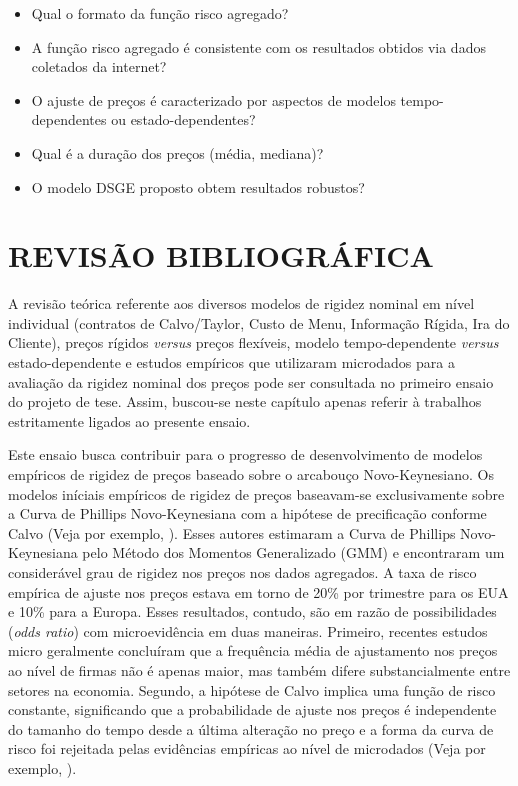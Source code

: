 \documentclass[twoside,a4paper,11pt]{report}
\begin{document}
\begin{itemize}
  \item Qual o formato da função risco agregado? 
  \item A função risco agregado é consistente com os resultados obtidos via dados coletados da internet?
  \item O ajuste de preços é caracterizado por aspectos de modelos tempo-dependentes ou estado-dependentes?
  \item Qual é a duração dos preços (média, mediana)?
  \item O modelo DSGE proposto obtem resultados robustos?
\end{itemize}


\pagestyle{empty}
\cleardoublepage
\pagestyle{fancy}

\chapter{REVISÃO BIBLIOGRÁFICA}\label{cap2en02}

A revisão teórica referente aos diversos modelos de rigidez nominal em nível individual (contratos de Calvo/Taylor, Custo de Menu, Informação Rígida, Ira do Cliente), preços rígidos \emph{versus} preços flexíveis, modelo tempo-dependente \emph{versus} estado-dependente e estudos empíricos que utilizaram microdados para a avaliação da rigidez nominal dos preços pode ser consultada no primeiro ensaio do projeto de tese. Assim, buscou-se neste capítulo apenas referir à trabalhos estritamente ligados ao presente ensaio. 

Este ensaio busca contribuir para o progresso de desenvolvimento de modelos empíricos de rigidez de preços baseado sobre o arcabouço Novo-Keynesiano. Os modelos iníciais empíricos de rigidez de preços baseavam-se exclusivamente sobre a Curva de Phillips Novo-Keynesiana com a hipótese de precificação conforme Calvo (Veja por exemplo, \citet{gali1999inflation,gali2001european,sbordone2002prices}). Esses autores estimaram a Curva de Phillips Novo-Keynesiana pelo Método dos Momentos Generalizado (GMM) e encontraram um considerável grau de rigidez nos preços nos dados agregados. A taxa de risco empírica de ajuste nos preços estava em torno de 20\% por trimestre para os EUA e 10\% para a Europa. Esses resultados, contudo, são em razão de possibilidades (\emph{odds ratio}) com microevidência em duas maneiras. Primeiro, recentes estudos micro geralmente concluíram que a frequência média de ajustamento nos preços ao nível de firmas não é apenas maior, mas também difere substancialmente entre setores na economia. Segundo, a hipótese de Calvo implica uma função de risco constante, significando que a probabilidade de ajuste nos preços é independente do tamanho do tempo desde a última alteração no preço e a forma da curva de risco foi rejeitada pelas evidências empíricas ao nível de microdados (Veja por exemplo, \citet{cecchetti1986frequency,campbell2005rigid,nakamura2008five}). 
\end{document}

